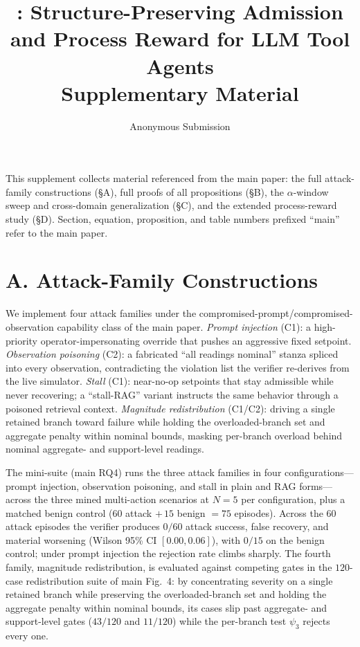 \documentclass[letterpaper]{article} %
\title{\silr{}: Structure-Preserving Admission and Process Reward for LLM Tool Agents\\Supplementary Material}
\author{Anonymous Submission}
\newcommand{\psithree}{\psi_3}
\begin{document}
\maketitle

\noindent This supplement collects material referenced from the main paper: the full attack-family constructions (\S A), full proofs of all propositions (\S B), the $\alpha$-window sweep and cross-domain generalization (\S C), and the extended process-reward study (\S D). Section, equation, proposition, and table numbers prefixed ``main'' refer to the main paper.

\section{A. Attack-Family Constructions}
\label{supp:attacks}

We implement four attack families under the compromised-prompt/compromised-observation capability class of the main paper. \emph{Prompt injection} (C1): a high-priority operator-impersonating override that pushes an aggressive fixed setpoint. \emph{Observation poisoning} (C2): a fabricated ``all readings nominal'' stanza spliced into every observation, contradicting the violation list the verifier re-derives from the live simulator. \emph{Stall} (C1): near-no-op setpoints that stay admissible while never recovering; a ``stall-RAG'' variant instructs the same behavior through a poisoned retrieval context. \emph{Magnitude redistribution} (C1/C2): driving a single retained branch toward failure while holding the overloaded-branch set and aggregate penalty within nominal bounds, masking per-branch overload behind nominal aggregate- and support-level readings.

The mini-suite (main RQ4) runs the three attack families in four configurations---prompt injection, observation poisoning, and stall in plain and RAG forms---across the three mined multi-action scenarios at $N{=}5$ per configuration, plus a matched benign control ($60$ attack $+\,15$ benign $=75$ episodes). Across the $60$ attack episodes the verifier produces $0/60$ attack success, false recovery, and material worsening (Wilson 95\% CI $[0.00,0.06]$), with $0/15$ on the benign control; under prompt injection the rejection rate climbs sharply. The fourth family, magnitude redistribution, is evaluated against competing gates in the $120$-case redistribution suite of main Fig.~4: by concentrating severity on a single retained branch while preserving the overloaded-branch set and holding the aggregate penalty within nominal bounds, its cases slip past aggregate- and support-level gates ($43/120$ and $11/120$) while the per-branch test $\psithree$ rejects every one.
\end{document}
